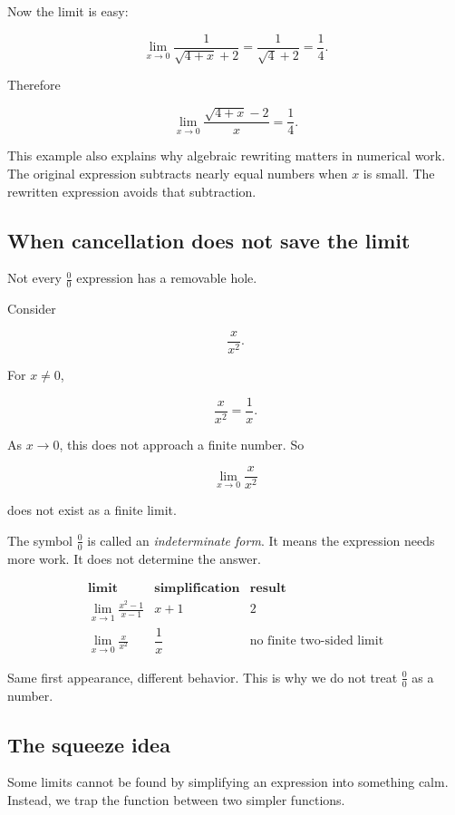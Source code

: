 Now the limit is easy:

\[
\lim_{x\to0}\frac{1}{\sqrt{4+x}+2}
=
\frac{1}{\sqrt4+2}
=
\frac14.
\]

Therefore

\[
\boxed{
\lim_{x\to0}\frac{\sqrt{4+x}-2}{x}
=
\frac14.
}
\]

This example also explains why algebraic rewriting matters in numerical work.  The original expression subtracts nearly equal numbers when \(x\) is small.  The rewritten expression avoids that subtraction.

\subsection{When cancellation does not save the limit}
\label{subsec:cancellation-does-not-save}

Not every \(\frac00\) expression has a removable hole.

Consider

\[
\frac{x}{x^2}.
\]

For \(x\neq0\),

\[
\frac{x}{x^2}=\frac1x.
\]

As \(x\to0\), this does not approach a finite number.  So

\[
\lim_{x\to0}\frac{x}{x^2}
\]

does not exist as a finite limit.

The symbol \(\frac00\) is called an \emph{indeterminate form}.  It means the expression needs more work.  It does not determine the answer.

\[
\begin{array}{c|c|c}
\textbf{limit} & \textbf{simplification} & \textbf{result} \\ \hline
\displaystyle \lim_{x\to1}\frac{x^2-1}{x-1}
&
x+1
&
2 \\[10pt]
\displaystyle \lim_{x\to0}\frac{x}{x^2}
&
\dfrac1x
&
\text{no finite two-sided limit}
\end{array}
\]

Same first appearance, different behavior.  This is why we do not treat \(\frac00\) as a number.

\subsection{The squeeze idea}
\label{subsec:squeeze-idea}

Some limits cannot be found by simplifying an expression into something calm.  Instead, we trap the function between two simpler functions.


